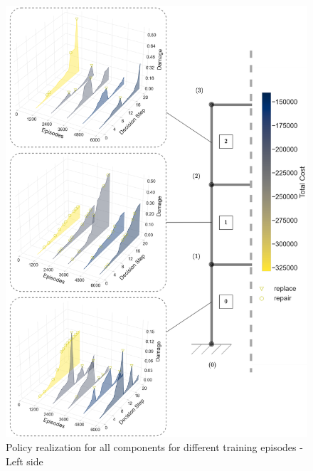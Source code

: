 \begin{figure}[H]
    \centering
    \includegraphics[width=.95\textwidth]{Figures/leftFrame.png}
	\caption{Policy realization for all components for different training episodes - Left side}
	\label{3dPolEpsL}
\end{figure}

